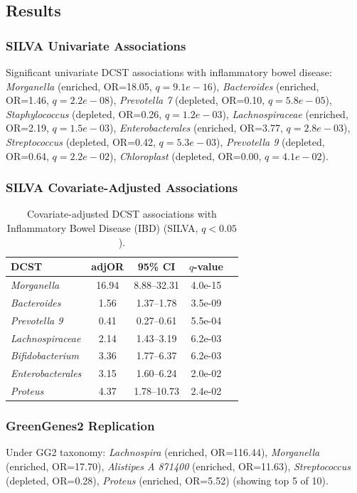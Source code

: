 \documentclass[11pt,a4paper]{article}
\begin{document}
\subsection{Results}
\subsubsection{SILVA Univariate Associations}
Significant univariate DCST associations with inflammatory bowel disease: \textit{Morganella} (enriched, OR=18.05, $q=9.1e-16$), \textit{Bacteroides} (enriched, OR=1.46, $q=2.2e-08$), \textit{Prevotella 7} (depleted, OR=0.10, $q=5.8e-05$), \textit{Staphylococcus} (depleted, OR=0.26, $q=1.2e-03$), \textit{Lachnospiraceae} (enriched, OR=2.19, $q=1.5e-03$), \textit{Enterobacterales} (enriched, OR=3.77, $q=2.8e-03$), \textit{Streptococcus} (depleted, OR=0.42, $q=5.3e-03$), \textit{Prevotella 9} (depleted, OR=0.64, $q=2.2e-02$), \textit{Chloroplast} (depleted, OR=0.00, $q=4.1e-02$).

\subsubsection{SILVA Covariate-Adjusted Associations}
\begin{table}[H]\centering\small
\caption{Covariate-adjusted DCST associations with Inflammatory Bowel Disease (IBD) (SILVA, $q<0.05$).}\label{tab:IBD_adj}
\begin{tabular}{lcccc}
\toprule
DCST & adjOR & 95\% CI & $q$-value \\
\midrule
\textit{Morganella} & 16.94 & 8.88--32.31 & 4.0e-15 \\
\textit{Bacteroides} & 1.56 & 1.37--1.78 & 3.5e-09 \\
\textit{Prevotella 9} & 0.41 & 0.27--0.61 & 5.5e-04 \\
\textit{Lachnospiraceae} & 2.14 & 1.43--3.19 & 6.2e-03 \\
\textit{Bifidobacterium} & 3.36 & 1.77--6.37 & 6.2e-03 \\
\textit{Enterobacterales} & 3.15 & 1.60--6.24 & 2.0e-02 \\
\textit{Proteus} & 4.37 & 1.78--10.73 & 2.4e-02 \\
\bottomrule
\end{tabular}\end{table}

\subsubsection{GreenGenes2 Replication}
Under GG2 taxonomy: \textit{Lachnospira} (enriched, OR=116.44), \textit{Morganella} (enriched, OR=17.70), \textit{Alistipes A 871400} (enriched, OR=11.63), \textit{Streptococcus} (depleted, OR=0.28), \textit{Proteus} (enriched, OR=5.52) (showing top 5 of 10).
\end{document}
